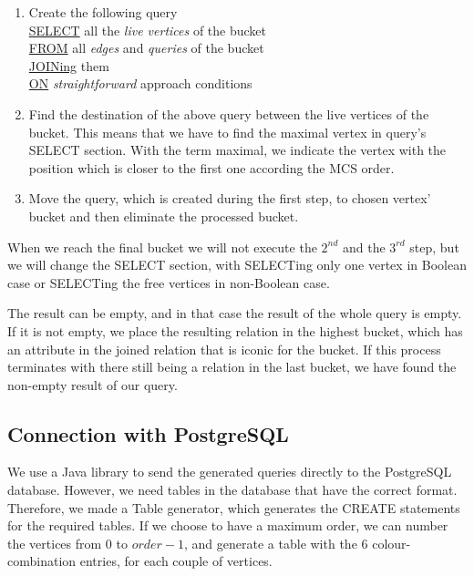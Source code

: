 \begin{enumerate}
\item Create the following query \\
\underline{SELECT} all the \emph{live vertices} of the bucket \\
\underline{FROM} all \emph{edges} and \emph{queries} of the bucket\\
\underline{JOINing} them \\
\underline{ON} \emph{straightforward} approach conditions
\item Find the destination of the above query between the live vertices of the bucket. This means that we have to find the maximal vertex in query's  SELECT section. With the term maximal, we indicate the vertex with the position which is closer to the first one according the MCS order. 
\item Move the query, which is created during the first step, to chosen vertex' bucket and then eliminate the processed bucket.
\end{enumerate}

When we reach the final bucket we will not execute the $2^{nd}$ and the $3^{rd}$ step, but we will change the SELECT section, with SELECTing only one vertex in Boolean case or SELECTing the free vertices in non-Boolean case.

The result can be empty, and in that case the result of the whole query is empty. If it is not empty, we place the resulting relation in the highest bucket, which has an attribute in the joined relation that is iconic for the bucket. If this process terminates with there still being a relation in the last bucket, we have found the non-empty result of our query.

\subsection{Connection with PostgreSQL}
We use a Java library to send the generated queries directly to the PostgreSQL database. However, we need tables in the database that have the correct format. Therefore, we made a Table generator, which generates the CREATE statements for the required tables. If we choose to have a maximum order, we can number the vertices from 0 to $order - 1$, and generate a table with the 6  colour-combination entries, for each couple of vertices.
